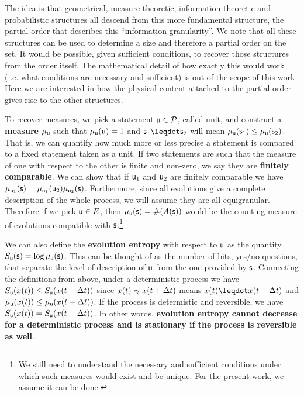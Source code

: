 \documentclass[letterpaper]{article}
\begin{document}
The idea is that geometrical, measure theoretic, information theoretic and probabilistic structures all descend from this more fundamental structure, the partial order that describes this ``information granularity''. We note that all these structures can be used to determine a size and therefore a partial order on the set. It would be possible, given sufficient conditions, to recover those structures from the order itself. The mathematical detail of how exactly this would work (i.e. what conditions are necessary and sufficient) is out of the scope of this work. Here we are interested in how the physical content attached to the partial order gives rise to the other structures.

To recover measures, we pick a statement $\stmt[u] \in \tdomain[P]$, called unit, and construct a \textbf{measure} $\mu_{\stmt[u]}$ such that $\mu_{\stmt[u]}(\stmt[u]) = 1$ and $\stmt_1 \finer \stmt_2$ will mean $\mu_{\stmt[u]}(\stmt_1) \leq \mu_{\stmt[u]}(\stmt_2)$. That is, we can quantify how much more or less precise a statement is compared to a fixed statement taken as a unit. If two statements are such that the measure of one with respect to the other is finite and non-zero, we say they are \textbf{finitely comparable}. We can show that if $\stmt[u]_1$ and $\stmt[u]_2$ are finitely comparable we have $ \mu_{\stmt[u]_1}(\stmt) = \mu_{\stmt[u]_1}(\stmt[u]_2) \mu_{\stmt[u]_2}(\stmt)$. Furthermore, since all evolutions give a complete description of the whole process, we will assume they are all equigranular. Therefore if we pick $\stmt[u] \in E$, then $\mu_{\stmt[u]}(\stmt)=\#(A(\stmt))$ would be the counting measure of evolutions compatible with $\stmt$.\footnote{We still need to understand the necessary and sufficient conditions under which such measures would exist and be unique. For the present work, we assume it can be done.}

We can also define the \textbf{evolution entropy} with respect to $\stmt[u]$ as the quantity $S_{\stmt[u]}(\stmt) = \log \mu_{\stmt[u]}(\stmt)$. This can be thought of as the number of bits, yes/no questions, that separate the level of description of $\stmt[u]$ from the one provided by $\stmt$. Connecting the definitions from above, under a deterministic process we have $S_{\stmt[u]}(x(t)) \leq S_{\stmt[u]}(x(t + \Delta t))$ since $x(t)\narrower x(t+\Delta t)$ means $x(t) \finer x(t+\Delta t)$ and $\mu_{\stmt[u]}(x(t)) \leq \mu_{\stmt[u]}(x(t+\Delta t))$. If the process is determistic and reversible, we have $S_{\stmt[u]}(x(t)) = S_{\stmt[u]}(x(t + \Delta t))$. In other words, \textbf{evolution entropy cannot decrease for a deterministic process and is stationary if the process is reversible as well}.
\end{document}
